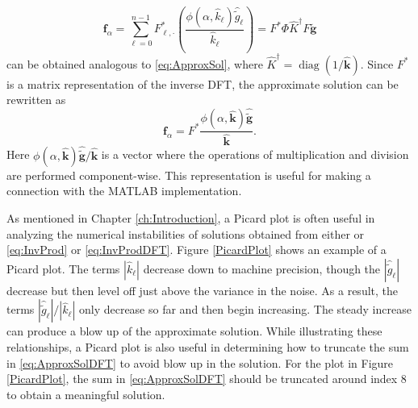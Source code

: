 \documentclass[12pt,notitlepage]{report}
\newcommand{\gnoise}{\widetilde{g}}	%
\newcommand{\gnoiseVec}{\widetilde{\mathbf{g}}}	%
\newcommand{\kVec}{\mathbf{k}}	%
\newcommand{\kMat}{K}	%
\newcommand{\fVec}{\mathbf{f}}	%
\newcommand{\ctrans}{*}	%
\DeclareMathOperator{\diag}{diag}	%
\newcommand{\regparam}{\alpha}
\newcommand{\filt}{\phi}
\begin{document}
\begin{equation}
\fVec_\regparam = \sum_{\ell = 0}^{n-1} F^\ctrans_{\ell,\cdot}\left(\frac{\filt(\regparam,\widehat{k}_\ell)\widehat{\gnoise}_\ell}{\widehat{k}_\ell}\right) = F^\ctrans\Phi\widehat{\kMat}^\dagger F\gnoiseVec
\label{eq:ApproxSolDFT}
\end{equation}
can be obtained analogous to \eqref{eq:ApproxSol}, where $\widehat{\kMat}^\dagger = \diag(1/\widehat{\kVec})$.
Since $F^\ctrans$ is a matrix representation of the inverse DFT, the approximate solution can be rewritten as
\[\fVec_\regparam = F^\ctrans \frac{\filt(\regparam,\widehat{\kVec})\widehat{\gnoiseVec}}{\widehat{\kVec}}.\]
Here $\filt(\regparam,\widehat{\kVec})\widehat{\gnoiseVec}/{\widehat{\kVec}}$ is a vector where the operations of multiplication and division are performed component-wise. This representation is useful for making a connection with the MATLAB implementation. \par
As mentioned in Chapter \ref{ch:Introduction}, a Picard plot is often useful in analyzing the numerical instabilities of solutions obtained from either or \eqref{eq:InvProd} or \eqref{eq:InvProdDFT}. Figure \ref{PicardPlot} shows an example of a Picard plot. The terms $|\widehat{k}_\ell|$ decrease down to machine precision, though the $|\widehat{\gnoise}_\ell|$ decrease but then level off just above the variance in the noise. As a result, the terms $|\widehat{\gnoise}_\ell|/|\widehat{k}_\ell|$ only decrease so far and then begin increasing. The steady increase can produce a blow up of the approximate solution. While illustrating these relationships, a Picard plot is also useful in determining how to truncate the sum in \eqref{eq:ApproxSolDFT} to avoid blow up in the solution. For the plot in Figure \ref{PicardPlot}, the sum in \eqref{eq:ApproxSolDFT} should be truncated around index 8 to obtain a meaningful solution. \par 
\end{document}
